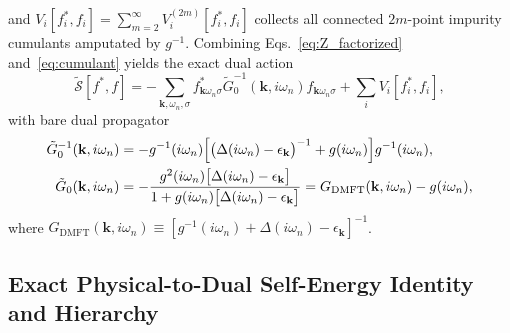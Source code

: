 \documentclass[11pt,a4paper]{article}
\numberwithin{equation}{section}
\theoremstyle{plain}
\theoremstyle{definition}
\providecommand{\vk}{\mathbf{k}}
\begin{document}
and $V_i[f^*_i,f_i] = \sum_{m=2}^{\infty} V_i^{(2m)}[f^*_i,f_i]$ collects all connected
$2m$-point impurity cumulants amputated by $g^{-1}$. Combining Eqs.~\eqref{eq:Z_factorized}
and~\eqref{eq:cumulant} yields the exact dual action
\begin{equation}
    \tilde{\mathcal{S}}[f^*,f]
    = -\sum_{\vk,\omega_n,\sigma} f^*_{\vk\omega_n\sigma}
      \tilde{G}_0^{-1}(\vk,i\omega_n) f_{\vk\omega_n\sigma}
      + \sum_{i} V_i[f^*_i, f_i],
    \label{eq:S_dual}
\end{equation}
with bare dual propagator
\begin{align}
    \tilde{G}_0^{-1}(\vk,i\omega_n)
    &= -g^{-1}(i\omega_n) \Bigl[ \bigl(\Delta(i\omega_n) - \epsilon_{\vk}\bigr)^{-1}
       + g(i\omega_n) \Bigr] g^{-1}(i\omega_n),
    \label{eq:G0_dual_inv} \\
    \tilde{G}_0(\vk,i\omega_n)
    &= -\frac{g^2(i\omega_n)\bigl[\Delta(i\omega_n) - \epsilon_{\vk}\bigr]}
             {1 + g(i\omega_n)\bigl[\Delta(i\omega_n) - \epsilon_{\vk}\bigr]}
     = G_{\mathrm{DMFT}}(\vk,i\omega_n) - g(i\omega_n),
    \label{eq:G0_dual}
\end{align}
where $G_{\mathrm{DMFT}}(\vk,i\omega_n) \equiv [g^{-1}(i\omega_n) + \Delta(i\omega_n) - \epsilon_{\vk}]^{-1}$.

\subsection{Exact Physical-to-Dual Self-Energy Identity and Hierarchy}
\label{sec:sigma_identity}
\end{document}
